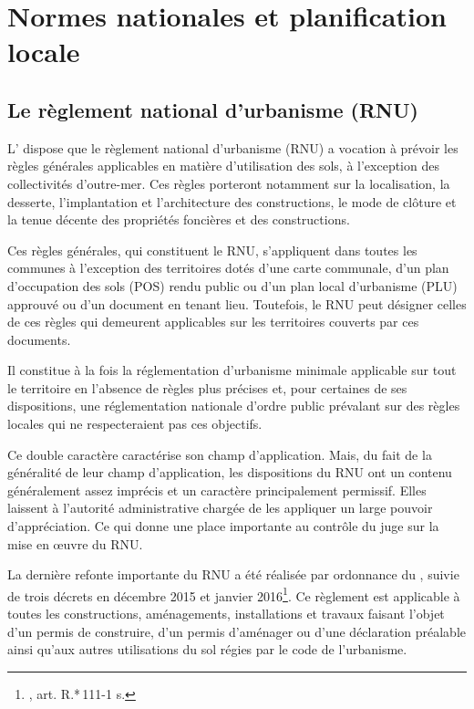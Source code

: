 
\chapter[Normes nationales et planif. locale]{Normes nationales et planification locale}

\section{Le règlement national d'urbanisme (RNU)}

	L' dispose que le règlement national d'urbanisme (RNU) a vocation à prévoir les règles générales applicables en matière d'utilisation des sols, à l'exception des collectivités d'outre-mer. Ces règles porteront notamment sur la localisation, la desserte, l'implantation et l'architecture des constructions, le mode de clôture et la tenue décente des propriétés foncières et des constructions.

	Ces règles générales, qui constituent le RNU, s'appliquent dans toutes les communes à l'exception des territoires dotés d'une carte communale, d'un plan d'occupation des sols (POS) rendu public ou d'un plan local d'urbanisme (PLU) approuvé ou d'un document en tenant lieu. Toutefois, le RNU peut désigner celles de ces règles qui demeurent applicables sur les territoires couverts par ces documents.

	\medbreak Il constitue à la fois la réglementation d'urbanisme minimale applicable sur tout le territoire en l'absence de règles plus précises et, pour certaines de ses dispositions, une réglementation nationale d'ordre public prévalant sur des règles locales qui ne respecteraient pas ces objectifs.

	Ce double caractère caractérise son champ d'application. Mais, du fait de la généralité de leur champ d'application, les dispositions du RNU ont un contenu généralement assez imprécis et un caractère principalement permissif.
	Elles laissent à l'autorité administrative chargée de les appliquer un large pouvoir d'appréciation. Ce qui donne une place importante au contrôle du juge sur la mise en œuvre du RNU.

	\medbreak La dernière refonte importante du RNU a été réalisée par ordonnance du , suivie de trois décrets en décembre 2015 et janvier 2016\footnote{\cu*, art. R.*\,111-1 s.}. Ce règlement est applicable à toutes les constructions, aménagements, installations et travaux faisant l'objet d'un permis de construire, d'un permis d'aménager ou d'une déclaration préalable ainsi qu'aux autres utilisations du sol régies par le code de l'urbanisme.

